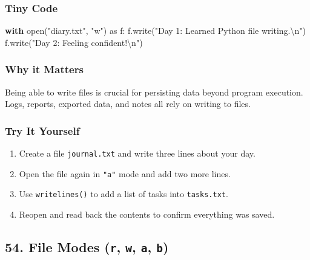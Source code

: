 \documentclass[
  letterpaper,
  DIV=11,
  numbers=noendperiod]{scrreprt}
\newenvironment{Shaded}{\begin{snugshade}}{\end{snugshade}}
\newcommand{\BuiltInTok}[1]{\textcolor[rgb]{0.00,0.23,0.31}{#1}}
\newcommand{\CharTok}[1]{\textcolor[rgb]{0.13,0.47,0.30}{#1}}
\newcommand{\ControlFlowTok}[1]{\textcolor[rgb]{0.00,0.23,0.31}{\textbf{#1}}}
\newcommand{\ImportTok}[1]{\textcolor[rgb]{0.00,0.46,0.62}{#1}}
\newcommand{\NormalTok}[1]{\textcolor[rgb]{0.00,0.23,0.31}{#1}}
\newcommand{\StringTok}[1]{\textcolor[rgb]{0.13,0.47,0.30}{#1}}
\providecommand{\tightlist}{%
  \setlength{\itemsep}{0pt}\setlength{\parskip}{0pt}}
\begin{document}
\subsubsection{Tiny Code}\label{tiny-code-52}

\begin{Shaded}
\begin{Highlighting}[]
\ControlFlowTok{with} \BuiltInTok{open}\NormalTok{(}\StringTok{"diary.txt"}\NormalTok{, }\StringTok{"w"}\NormalTok{) }\ImportTok{as}\NormalTok{ f:}
\NormalTok{    f.write(}\StringTok{"Day 1: Learned Python file writing.}\CharTok{\textbackslash{}n}\StringTok{"}\NormalTok{)}
\NormalTok{    f.write(}\StringTok{"Day 2: Feeling confident!}\CharTok{\textbackslash{}n}\StringTok{"}\NormalTok{)}
\end{Highlighting}
\end{Shaded}

\subsubsection{Why it Matters}\label{why-it-matters-52}

Being able to write files is crucial for persisting data beyond program
execution. Logs, reports, exported data, and notes all rely on writing
to files.

\subsubsection{Try It Yourself}\label{try-it-yourself-52}

\begin{enumerate}
\def\labelenumi{\arabic{enumi}.}
\tightlist
\item
  Create a file \texttt{journal.txt} and write three lines about your
  day.
\item
  Open the file again in \texttt{"a"} mode and add two more lines.
\item
  Use \texttt{writelines()} to add a list of tasks into
  \texttt{tasks.txt}.
\item
  Reopen and read back the contents to confirm everything was saved.
\end{enumerate}

\subsection{\texorpdfstring{54. File Modes (\texttt{r}, \texttt{w},
\texttt{a},
\texttt{b})}{54. File Modes (r, w, a, b)}}\label{file-modes-r-w-a-b}
\end{document}
